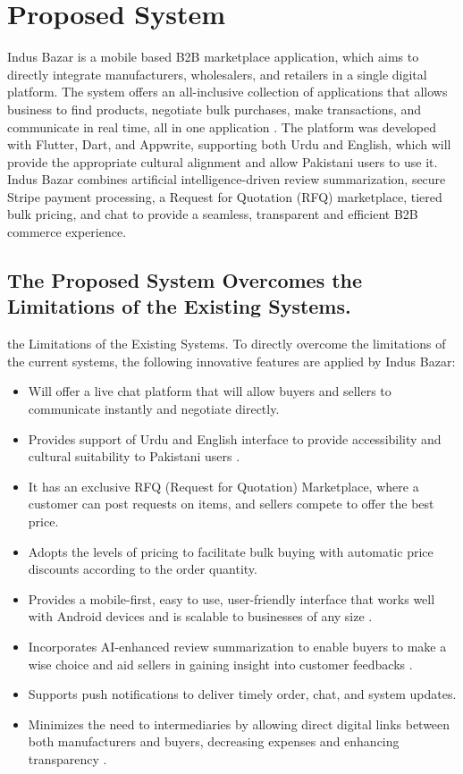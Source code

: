 \section{Proposed System}
Indus Bazar is a mobile based B2B marketplace application, which aims to directly integrate manufacturers, wholesalers, and retailers in a single digital platform. The system offers an all-inclusive collection of applications that allows business to find products, negotiate bulk purchases, make transactions, and communicate in real time, all in one application \cite{farooq2024mobile}. The platform was developed with Flutter, Dart, and Appwrite, supporting both Urdu and English, which will provide the appropriate cultural alignment and allow Pakistani users to use it. Indus Bazar combines artificial intelligence-driven review summarization, secure Stripe payment processing, a Request for Quotation (RFQ) marketplace, tiered bulk pricing, and chat to provide a seamless, transparent and efficient B2B commerce experience.

\subsection{The Proposed System Overcomes the Limitations of the Existing Systems.}
the Limitations of the Existing Systems.
To directly overcome the limitations of the current systems, the following innovative features are applied by Indus Bazar:

\begin{itemize}
    \item Will offer a live chat platform that will allow buyers and sellers to communicate instantly and negotiate directly.
    \item Provides support of Urdu and English interface to provide accessibility and cultural suitability to Pakistani users \cite{akram2022user}.
    \item It has an exclusive RFQ (Request for Quotation) Marketplace, where a customer can post requests on items, and sellers compete to offer the best price.
    \item Adopts the levels of pricing to facilitate bulk buying with automatic price discounts according to the order quantity.
    \item Provides a mobile-first, easy to use, user-friendly interface that works well with Android devices and is scalable to businesses of any size \cite{farooq2024mobile}.
    \item Incorporates AI-enhanced review summarization to enable buyers to make a wise choice and aid sellers in gaining insight into customer feedbacks \cite{chaffey2022digital}.
    \item Supports push notifications to deliver timely order, chat, and system updates.
    \item Minimizes the need to intermediaries by allowing direct digital links between both manufacturers and buyers, decreasing expenses and enhancing transparency \cite{hussain2023supply}.
\end{itemize}

